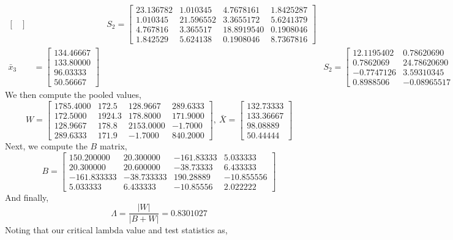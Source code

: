\documentclass[letterpaper,10pt]{article}
\begin{document}
\begin{description}
\begin{align*}
\begin{bmatrix}
\end{bmatrix}&& S_2=\begin{bmatrix}
23.136782 & 1.010345 & 4.7678161 & 1.8425287\\
1.010345 & 21.596552 & 3.3655172 & 5.6241379\\
4.767816 & 3.365517 & 18.8919540 & 0.1908046\\
1.842529 & 5.624138 & 0.1908046 & 8.7367816
\end{bmatrix}\\
\bar{x}_3 &= \begin{bmatrix}
134.46667\\ 133.80000\\ 96.03333\\ 50.56667
\end{bmatrix}&& S_2=\begin{bmatrix}
12.1195402 & 0.78620690 & -0.7747126 & 0.89885057\\
0.7862069 & 24.78620690 & 3.5931034 & -0.08965517\\
-0.7747126 & 3.59310345 & 20.7229885 & 1.67011494\\
0.8988506 & -0.08965517 & 1.6701149 & 12.59885057
\end{bmatrix}
\end{align*}
We then compute the pooled values,
\[W=\begin{bmatrix}
1785.4000 & 172.5 & 128.9667 & 289.6333\\
172.5000 & 1924.3 & 178.8000 & 171.9000\\
128.9667 & 178.8 & 2153.0000 & -1.7000\\
289.6333 & 171.9 & -1.7000 & 840.2000
\end{bmatrix},\ \bar{X}=\begin{bmatrix}
132.73333\\
133.36667\\
98.08889\\
50.44444
\end{bmatrix} \]
Next, we compute the $B$ matrix, 
\[B=\begin{bmatrix}
150.200000 & 20.300000 & -161.83333 & 5.033333\\
20.300000 & 20.600000 & -38.73333 & 6.433333\\
-161.833333 & -38.733333 & 190.28889 & -10.855556\\
5.033333 & 6.433333 & -10.85556 & 2.022222
\end{bmatrix} \]
And finally,
\[\Lambda=\frac{|W|}{|B+W|}=0.8301027\]
Noting that our critical lambda value and test statistics as,
\begin{align*}

\end{align*}
\end{description}
\end{document}
